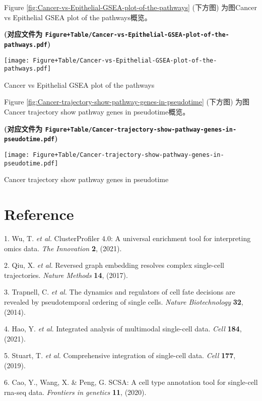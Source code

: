 \documentclass[
]{article}
\newenvironment{cslreferences}%
  {}%
  {\par}
\begin{document}
Figure \ref{fig:Cancer-vs-Epithelial-GSEA-plot-of-the-pathways} (下方图) 为图Cancer vs Epithelial GSEA plot of the pathways概览。

\textbf{(对应文件为 \texttt{Figure+Table/Cancer-vs-Epithelial-GSEA-plot-of-the-pathways.pdf})}

\def\@captype{figure}
\begin{center}
\texttt{[image: Figure+Table/Cancer-vs-Epithelial-GSEA-plot-of-the-pathways.pdf]}
\caption{Cancer vs Epithelial GSEA plot of the pathways}\label{fig:Cancer-vs-Epithelial-GSEA-plot-of-the-pathways}
\end{center}

Figure \ref{fig:Cancer-trajectory-show-pathway-genes-in-pseudotime} (下方图) 为图Cancer trajectory show pathway genes in pseudotime概览。

\textbf{(对应文件为 \texttt{Figure+Table/Cancer-trajectory-show-pathway-genes-in-pseudotime.pdf})}

\def\@captype{figure}
\begin{center}
\texttt{[image: Figure+Table/Cancer-trajectory-show-pathway-genes-in-pseudotime.pdf]}
\caption{Cancer trajectory show pathway genes in pseudotime}\label{fig:Cancer-trajectory-show-pathway-genes-in-pseudotime}
\end{center}

\hypertarget{bibliography}{%
\section*{Reference}\label{bibliography}}

\hypertarget{refs}{}
\begin{cslreferences}
\leavevmode\hypertarget{ref-ClusterprofilerWuTi2021}{}%
1. Wu, T. \emph{et al.} ClusterProfiler 4.0: A universal enrichment tool for interpreting omics data. \emph{The Innovation} \textbf{2}, (2021).

\leavevmode\hypertarget{ref-ReversedGraphQiuX2017}{}%
2. Qiu, X. \emph{et al.} Reversed graph embedding resolves complex single-cell trajectories. \emph{Nature Methods} \textbf{14}, (2017).

\leavevmode\hypertarget{ref-TheDynamicsAnTrapne2014}{}%
3. Trapnell, C. \emph{et al.} The dynamics and regulators of cell fate decisions are revealed by pseudotemporal ordering of single cells. \emph{Nature Biotechnology} \textbf{32}, (2014).

\leavevmode\hypertarget{ref-IntegratedAnalHaoY2021}{}%
4. Hao, Y. \emph{et al.} Integrated analysis of multimodal single-cell data. \emph{Cell} \textbf{184}, (2021).

\leavevmode\hypertarget{ref-ComprehensiveIStuart2019}{}%
5. Stuart, T. \emph{et al.} Comprehensive integration of single-cell data. \emph{Cell} \textbf{177}, (2019).

\leavevmode\hypertarget{ref-ScsaACellTyCaoY2020}{}%
6. Cao, Y., Wang, X. \& Peng, G. SCSA: A cell type annotation tool for single-cell rna-seq data. \emph{Frontiers in genetics} \textbf{11}, (2020).
\end{cslreferences}
\end{document}
